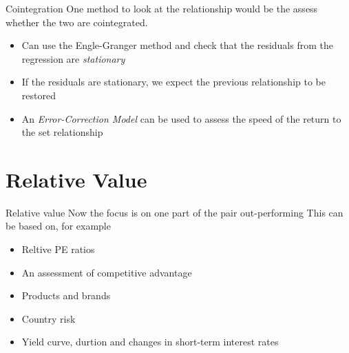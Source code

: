 \documentclass[14pt,xcolor=pdftex,dvipsnames,table]{beamer}\usepackage[]{graphicx}\usepackage[]{color}
\begin{document}

\begin{frame}{Cointegration}
One method to look at the relationship would be the assess whether the two are cointegrated.
\begin{itemize}[<+-| alert@+>]
\item Can use the Engle-Granger method and check that the residuals from the regression are \emph{stationary}
\item If the residuals are stationary, we expect the previous relationship to be restored
\item An \emph{Error-Correction Model} can be used to assess the speed of the return to the set relationship
\end{itemize}
\end{frame}




\section{Relative Value}
\begin{frame}{Relative value}
Now the focus is on one part of the pair out-performing
This can be based on, for example
\begin{itemize}[<+-| alert@+>]
\item Reltive PE ratios
\item An assessment of competitive advantage
\item Products and brands
\item Country risk
\item Yield curve, durtion and changes in short-term interest rates
\end{itemize}

\end{frame}
\end{document}
